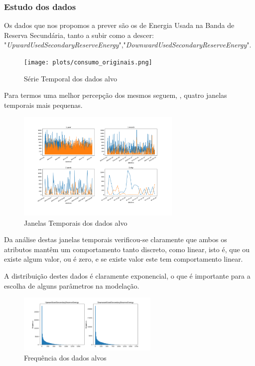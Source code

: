 
\subsubsection{Estudo dos dados}

Os dados que nos propomos a prever são os de Energia Usada na Banda de Reserva Secundária, tanto a subir como a descer: "\textit{UpwardUsedSecondaryReserveEnergy}","\textit{DownwardUsedSecondaryReserveEnergy}".\par



\begin{figure}[H]
  \centering
  \texttt{[image: plots/consumo\_originais.png]}
  \caption{Série Temporal dos dados alvo}
  \label{fig:targettimeseries}
\end{figure}


Para termos uma melhor percepção dos mesmos seguem, , quatro janelas temporais mais pequenas.

\begin{figure}[H]
  \centering
  \includegraphics[width=0.7\textwidth]{plots/target_timeseries_windows.png}
  \caption{Janelas Temporais dos dados alvo}
  \label{fig:targettimeserieswindows}
\end{figure}


Da análise destas janelas temporais verificou-se claramente que ambos os atributos mantêm um comportamento tanto discreto, como linear, isto é, que ou existe algum valor, ou é zero, e se existe valor este tem comportamento linear.\par
A distribuição destes dados é claramente exponencial, o que é importante para a escolha de alguns parâmetros na modelação.\par

		
\begin{figure}[H]
  \centering
  \includegraphics[width=0.6\textwidth]{plots/target_histograms.png}
  \caption{Frequência dos dados alvos}
  \label{fig:targethistograms}
\end{figure}


